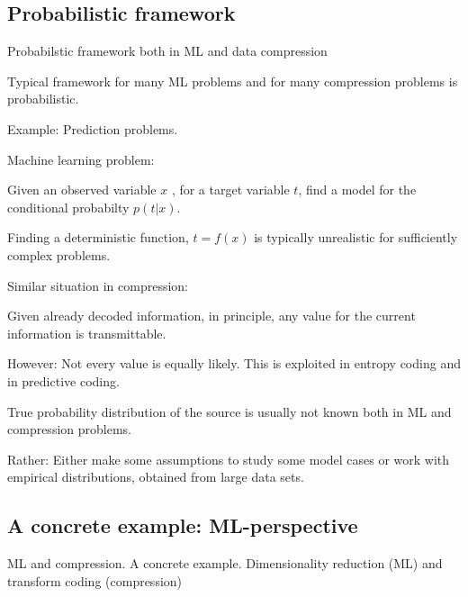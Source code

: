 \subsection{Probabilistic framework}
\begin{frame}{Probabilstic framework both in ML and data compression}
\bit
\item Typical framework for many ML problems and for many compression problems is probabilistic.
\item Example: Prediction problems. 
\bit 
\item Machine learning problem: 
\bit
\item Given an observed variable $x$ , for a target variable $t$,  find a model for the conditional probabilty $p(t|x)$.
\item Finding a deterministic function, $t=f(x)$ is typically unrealistic for sufficiently complex problems.  
\eit
\item  Similar situation in compression:
\bit
\item Given already decoded information, in principle, any value for the current information is transmittable. 
\item However: Not every value is equally likely. This is exploited in entropy coding and in predictive coding. 
\eit
\eit
\item True probability distribution of the source is usually not known both in ML and compression problems.  
\item Rather: Either make some assumptions to study some model cases or work with empirical distributions, obtained from large data sets.
\eit
\end{frame}


\subsection{A concrete example: ML-perspective}
\begin{frame}{ML and compression. A concrete example. Dimensionality reduction (ML) and transform coding (compression)}
\end{frame}

